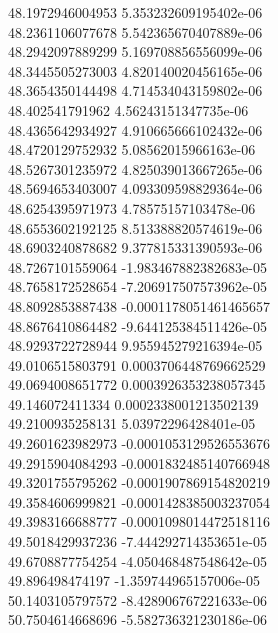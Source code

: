 {48.1972946004953 5.353232609195402e-06 \\
48.2361106077678 5.542365670407889e-06 \\
48.2942097889299 5.169708856556099e-06 \\
48.3445505273003 4.820140020456165e-06 \\
48.3654350144498 4.714534043159802e-06 \\
48.402541791962 4.56243151347735e-06 \\
48.4365642934927 4.910665666102432e-06 \\
48.4720129752932 5.08562015966163e-06 \\
48.5267301235972 4.825039013667265e-06 \\
48.5694653403007 4.093309598829364e-06 \\
48.6254395971973 4.78575157103478e-06 \\
48.6553602192125 8.513388820574619e-06 \\
48.6903240878682 9.377815331390593e-06 \\
48.7267101559064 -1.983467882382683e-05 \\
48.7658172528654 -7.206917507573962e-05 \\
48.8092853887438 -0.0001178051461465657 \\
48.8676410864482 -9.644125384511426e-05 \\
48.9293722728944 9.955945279216394e-05 \\
49.0106515803791 0.0003706448769662529 \\
49.0694008651772 0.0003926353238057345 \\
49.146072411334 0.0002338001213502139 \\
49.2100935258131 5.03972296428401e-05 \\
49.2601623982973 -0.0001053129526553676 \\
49.2915904084293 -0.0001832485140766948 \\
49.3201755795262 -0.0001907869154820219 \\
49.3584606999821 -0.0001428385003237054 \\
49.3983166688777 -0.0001098014472518116 \\
49.5018429937236 -7.444292714353651e-05 \\
49.6708877754254 -4.050468487548642e-05 \\
49.896498474197 -1.359744965157006e-05 \\
50.1403105797572 -8.428906767221633e-06 \\
50.7504614668696 -5.582736321230186e-06 \\
}

